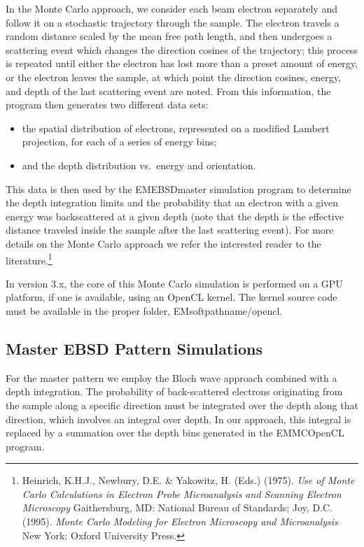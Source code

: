 \documentclass[DIV=calc, paper=letter, fontsize=11pt]{scrartcl}	 %
\begin{document}
In the Monte Carlo approach, we consider each beam electron separately and follow it on a stochastic trajectory 
through the sample.  The electron travels a random distance scaled by the mean free path length, and then undergoes a 
scattering event which changes the direction cosines of the trajectory; this process is repeated until either the electron has
lost more than a preset amount of energy, or the electron leaves the sample, at which point the direction cosines, energy,
and depth of the last scattering event are noted.  From this information, the program then generates two different data sets:
\begin{itemize}
	\item the spatial distribution of electrons, represented on a modified Lambert projection, for each of a series of 
	energy bins;
	\item and the depth distribution vs.\ energy and orientation.
\end{itemize}
This data is then used by the  EMEBSDmaster simulation program to determine the depth integration limits and the probability 
that an electron with a given energy was backscattered at a given depth (note that the depth is the effective distance traveled 
inside the sample after the last scattering event).  For more details on the Monte Carlo approach we refer the interested reader to
the literature.\footnote{Heinrich, K.H.J., Newbury, D.E. \& Yakowitz, H. (Eds.) (1975).
\textit{Use of Monte Carlo Calculations in Electron Probe Microanalysis and Scanning Electron Microscopy} Gaithersburg, MD: National Bureau of Standards;
Joy, D.C. (1995). \textit{Monte Carlo Modeling for Electron Microscopy and Microanalysis} New York: Oxford University Press.}

In version 3.x, the core of this Monte Carlo simulation is performed on a GPU platform, if one is available, using an OpenCL kernel.  The kernel source code 
must be available in the proper folder, EMsoftpathname/opencl.

\subsection{Master EBSD Pattern Simulations \label{sec:Master}}
For the master pattern we employ the Bloch wave approach combined with a depth integration.  The probability 
of back-scattered electrons originating from the sample along a specific direction must be integrated over the depth
along that direction, which involves an integral over depth.  In our approach, this integral is replaced by a summation
over the depth bins generated in the \textsf{EMMCOpenCL} program.  
\end{document}
